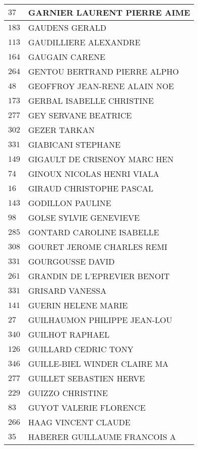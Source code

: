 \begin{xltabular}{\linewidth}{|l|X|}
    \hline
    $37$ & GARNIER LAURENT PIERRE AIME \\
    \hline
    $183$ & GAUDENS GERALD \\
    \hline
    $113$ & GAUDILLIERE ALEXANDRE \\
    \hline
    $164$ & GAUGAIN CARENE \\
    \hline
    $264$ & GENTOU BERTRAND PIERRE ALPHO \\
    \hline
    $48$ & GEOFFROY JEAN-RENE ALAIN NOE \\
    \hline
    $173$ & GERBAL ISABELLE CHRISTINE \\
    \hline
    $277$ & GEY SERVANE BEATRICE \\
    \hline
    $302$ & GEZER TARKAN \\
    \hline
    $331$ & GIABICANI STEPHANE \\
    \hline
    $149$ & GIGAULT DE CRISENOY MARC HEN \\
    \hline
    $74$ & GINOUX NICOLAS HENRI VIALA \\
    \hline
    $16$ & GIRAUD CHRISTOPHE PASCAL \\
    \hline
    $143$ & GODILLON PAULINE \\
    \hline
    $98$ & GOLSE SYLVIE GENEVIEVE \\
    \hline
    $285$ & GONTARD CAROLINE ISABELLE \\
    \hline
    $308$ & GOURET JEROME CHARLES REMI \\
    \hline
    $331$ & GOURGOUSSE DAVID \\
    \hline
    $261$ & GRANDIN DE L'EPREVIER BENOIT \\
    \hline
    $331$ & GRISARD VANESSA \\
    \hline
    $141$ & GUERIN HELENE MARIE \\
    \hline
    $27$ & GUILHAUMON PHILIPPE JEAN-LOU \\
    \hline
    $340$ & GUILHOT RAPHAEL \\
    \hline
    $126$ & GUILLARD CEDRIC TONY \\
    \hline
    $346$ & GUILLE-BIEL WINDER CLAIRE MA \\
    \hline
    $277$ & GUILLET SEBASTIEN HERVE \\
    \hline
    $229$ & GUIZZO CHRISTINE \\
    \hline
    $83$ & GUYOT VALERIE FLORENCE \\
    \hline
    $266$ & HAAG VINCENT CLAUDE \\
    \hline
    $35$ & HABERER GUILLAUME FRANCOIS A \\

\end{xltabular}
